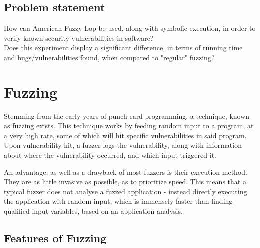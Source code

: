 \documentclass[a4paper]{article}
\begin{document}
\subsection{Problem statement}
How can American Fuzzy Lop be used, along with symbolic execution, in order to verify known security vulnerabilities in software?\\
Does this experiment display a significant difference, in terms of running time and bugs/vulnerabilities found, when compared to "regular" fuzzing?
\newpage
\section{Fuzzing}
Stemming from the early years of punch-card-programming, a technique, known as fuzzing exists. This technique works by feeding random input to a program, at a very high rate, some of which will hit specific vulnerabilities in said program. Upon vulnerability-hit, a fuzzer logs the vulnerability, along with information about where the vulnerability occurred, and which input triggered it.

An advantage, as well as a drawback of most fuzzers is their execution method. They are as little invasive as possible, as to prioritize speed. This means that a typical fuzzer does not analyse a fuzzed application - instead directly executing the application with random input, which is immensely faster than finding qualified input variables, based on an application analysis.
\subsection{Features of Fuzzing}
\end{document}
